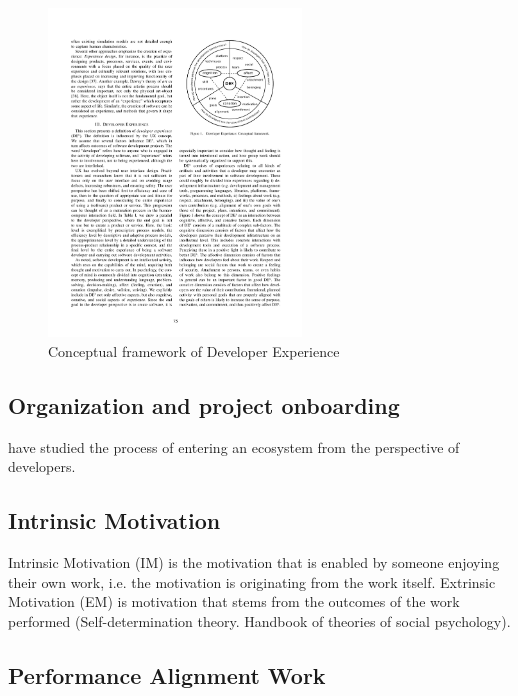 \documentclass[english, 12pt, a4paper, sci, utf8, a-1b, online]{aaltothesis}
\begin{document}
\begin{figure}[H]
  \captionsetup{width=0.6\textwidth}
  \caption{Conceptual framework of Developer Experience \citep{fagerholm-dx-concept-and-definition}}
  \begin{center}
    \includegraphics[width=0.6\textwidth]{dx-conceptual.pdf}
  \end{center}
\end{figure}

\subsection{Organization and project onboarding}

\cite{entering-an-ecosystem} have studied the process of entering an ecosystem from the perspective of developers. 

\subsection{Intrinsic Motivation}

Intrinsic Motivation (IM) is the motivation that is enabled by someone enjoying their own work, i.e. the motivation is originating from the work itself. Extrinsic Motivation (EM) is motivation that stems from the outcomes of the work performed \citep{kuusinen-flow} (Self-determination theory. Handbook of theories of social psychology).

\subsection{Performance Alignment Work}
\end{document}
